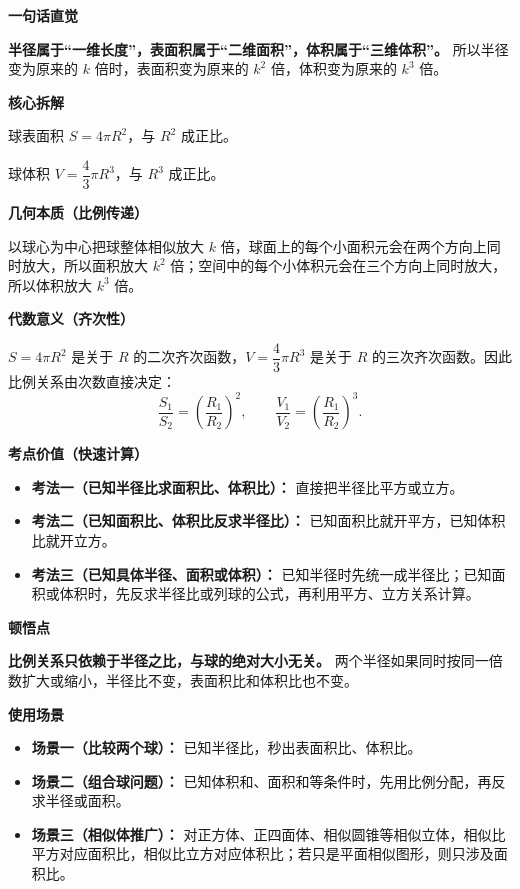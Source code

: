 \begin{explanationbox}

\textbf{\textcolor{CExplanation}{一句话直觉}}

\textbf{半径属于“一维长度”，表面积属于“二维面积”，体积属于“三维体积”。} 所以半径变为原来的 $k$ 倍时，表面积变为原来的 $k^2$ 倍，体积变为原来的 $k^3$ 倍。

\medskip
\textbf{\textcolor{CExplanation}{核心拆解}}
\begin{description}[style=nextline, leftmargin=2.8em, labelsep=0.5em, itemsep=0.45em]
    \item[\textbf{要点一（面积公式）：}] 球表面积 $S=4\pi R^2$，与 $R^2$ 成正比。
    \item[\textbf{要点二（体积公式）：}] 球体积 $V=\dfrac{4}{3}\pi R^3$，与 $R^3$ 成正比。
\end{description}

\medskip
\textbf{\textcolor{CExplanation}{几何本质（比例传递）}}

以球心为中心把球整体相似放大 $k$ 倍，球面上的每个小面积元会在两个方向上同时放大，所以面积放大 $k^2$ 倍；空间中的每个小体积元会在三个方向上同时放大，所以体积放大 $k^3$ 倍。

\medskip
\textbf{\textcolor{CExplanation}{代数意义（齐次性）}}

$S=4\pi R^2$ 是关于 $R$ 的二次齐次函数，$V=\dfrac{4}{3}\pi R^3$ 是关于 $R$ 的三次齐次函数。因此比例关系由次数直接决定：
\[
\frac{S_1}{S_2}=\left(\frac{R_1}{R_2}\right)^2,
\qquad
\frac{V_1}{V_2}=\left(\frac{R_1}{R_2}\right)^3.
\]

\medskip
\textbf{\textcolor{CExplanation}{考点价值（快速计算）}}
\begin{itemize}[leftmargin=*, itemsep=0.5em, topsep=0.4em]
    \item \textbf{考法一（已知半径比求面积比、体积比）：} 直接把半径比平方或立方。
    \item \textbf{考法二（已知面积比、体积比反求半径比）：} 已知面积比就开平方，已知体积比就开立方。
    \item \textbf{考法三（已知具体半径、面积或体积）：} 已知半径时先统一成半径比；已知面积或体积时，先反求半径比或列球的公式，再利用平方、立方关系计算。
\end{itemize}

\medskip
\textbf{\textcolor{CExplanation}{顿悟点}}

\textbf{比例关系只依赖于半径之比，与球的绝对大小无关。} 两个半径如果同时按同一倍数扩大或缩小，半径比不变，表面积比和体积比也不变。

\medskip
\textbf{\textcolor{CExplanation}{使用场景}}
\begin{itemize}[leftmargin=*, itemsep=0.5em, topsep=0.4em]
    \item \textbf{场景一（比较两个球）：} 已知半径比，秒出表面积比、体积比。
    \item \textbf{场景二（组合球问题）：} 已知体积和、面积和等条件时，先用比例分配，再反求半径或面积。
    \item \textbf{场景三（相似体推广）：} 对正方体、正四面体、相似圆锥等相似立体，相似比平方对应面积比，相似比立方对应体积比；若只是平面相似图形，则只涉及面积比。
\end{itemize}
\end{explanationbox}
